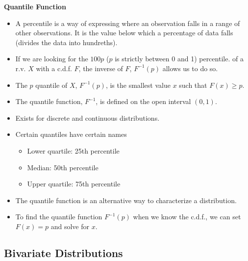 \documentclass[11pt]{article}
\begin{document}
\textbf{Quantile Function}
\begin{itemize}
    \item A percentile is a way of expressing where an observation falls in a range of other 
    observations. It is the value below which a percentage of data falls (divides the data into
    hundreths).
    \item If we are looking for the $100p$ ($p$ is strictly between 0 and 1) percentile.
    of a r.v. $X$ with a c.d.f. $F$, the inverse of $F$, $F^{-1}(p)$ allows us to do so.
    \item The $p$ quantile of $X$, $F^{-1}(p)$, is the smallest value $x$ such that $F(x) \ge p$.
    \item The quantile function, $F^{-1}$, is defined on the open interval $(0,1)$.
    \item Exists for discrete and continuous distributions.
    \item Certain quantiles have certain names
    \begin{itemize}
        \item Lower quartile: 25th percentile
        \item Median: 50th percentile
        \item Upper quartile: 75th percentile
    \end{itemize}
    \item The quantile function is an alternative way to characterize a distribution.
    \item To find the quantile function $F^{-1}(p)$ when we know the c.d.f., we can set $F(x)=p$ and 
    solve for $x$.
\end{itemize}

\subsection{Bivariate Distributions}
\end{document}
